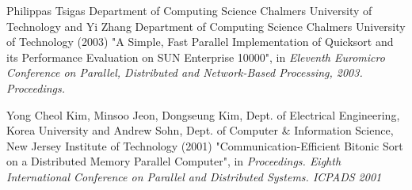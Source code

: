 \begin{thebibliography}{9}

Philippas Tsigas Department of Computing Science Chalmers University of Technology and Yi Zhang Department of Computing Science Chalmers University of Technology (2003) "A Simple, Fast Parallel Implementation of Quicksort and its Performance Evaluation on SUN Enterprise 10000", in \textit{ Eleventh Euromicro Conference on Parallel, Distributed and Network-Based Processing, 2003. Proceedings.}

Yong Cheol Kim, Minsoo Jeon, Dongseung Kim, Dept. of Electrical Engineering, Korea University and Andrew Sohn, Dept. of Computer \& Information Science, New Jersey Institute of Technology (2001) "Communication-Efficient Bitonic Sort on a Distributed Memory Parallel Computer", in \textit{ Proceedings. Eighth International Conference on Parallel and Distributed Systems. ICPADS 2001}

\end{thebibliography}